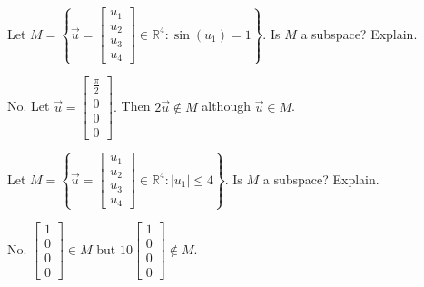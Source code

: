 \documentclass{ximera}
\begin{document}
\begin{problem}\label{prb:5.9} Let $M=\left\{ \vec{u}=\left[
\begin{array}{c}
u_{1} \\
u_{2} \\
u_{3} \\
u_{4}
\end{array}
\right] \in
\mathbb{R}^{4}:\sin \left( u_{1}\right) =1\right\} .$ Is $M$ a subspace?
Explain.
\begin{hint}
No. Let $\vec{u}=\left[ \begin{array}{r}
\frac{\pi }{2} \\
0 \\
0 \\
0
\end{array}
\right] .$ Then $2\vec{u}\notin M$ although $\vec{u}\in M$.
\end{hint}
\end{problem}

\begin{problem}\label{prb:5.10} Let $M=\left\{ \vec{u}=\left[ \begin{array}{c}
u_{1} \\
u_{2} \\
u_{3} \\
u_{4}
\end{array}\right] \in
\mathbb{R}^{4}:|u_{1}| \leq 4\right\} .$ Is $M$ a
subspace? Explain.
\begin{hint}
No. $\left[
\begin{array}{r}
1 \\
0 \\
0 \\
0
\end{array}
\right] \in M$ but $10\left[ \begin{array}{r}
1 \\
0 \\
0 \\
0
\end{array}
\right] \notin M.$
\end{hint}
\end{problem}
\end{document}
